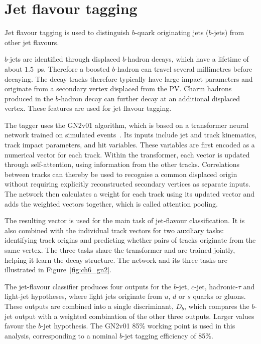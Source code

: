 \section{Jet flavour tagging}
\label{sec:ch6_btag}

Jet flavour tagging is used to distinguish $b$-quark originating jets ($b$-jets) from other jet flavours.

$b$-jets are identified through displaced $b$-hadron decays, which have a lifetime of about $1.5$~ps. Therefore a boosted $b$-hadron can travel several millimetres before decaying.
The decay tracks therefore typically have large impact parameters and originate from a secondary vertex displaced from the PV.
Charm hadrons produced in the $b$-hadron decay can further decay at an additional displaced vertex.
These features are used for jet flavour tagging.

The tagger uses the GN2v01 algorithm, which is based on a transformer neural network trained on simulated events~\cite{ATLAS2026GN2}.
Its inputs include jet and track kinematics, track impact parameters, and hit variables.
These variables are first encoded as a numerical vector for each track.
Within the transformer, each vector is updated through self-attention, using information from the other tracks.
Correlations between tracks can thereby be used to recognise a common displaced origin without requiring explicitly reconstructed secondary vertices as separate inputs.
The network then calculates a weight for each track using its updated vector and adds the weighted vectors together, which is called attention pooling.

The resulting vector is used for the main task of jet-flavour classification.
It is also combined with the individual track vectors for two auxiliary tasks: identifying track origins and predicting whether pairs of tracks originate from the same vertex.
The three tasks share the transformer and are trained jointly, helping it learn the decay structure.
The network and its three tasks are illustrated in Figure~\ref{fig:ch6_gn2}.

The jet-flavour classifier produces four outputs for the $b$-jet, $c$-jet, hadronic-$\tau$ and light-jet hypotheses, where light jets originate from $u$, $d$ or $s$ quarks or gluons.
These outputs are combined into a single discriminant, $D_b$, which compares the $b$-jet output with a weighted combination of the other three outputs.
Larger values favour the $b$-jet hypothesis.
The GN2v01 85\% working point is used in this analysis, corresponding to a nominal $b$-jet tagging efficiency of 85\%.


